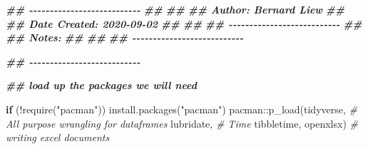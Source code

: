 \documentclass[
]{book}
\newenvironment{Shaded}{\begin{snugshade}}{\end{snugshade}}
\newcommand{\CommentTok}[1]{\textcolor[rgb]{0.56,0.35,0.01}{\textit{#1}}}
\newcommand{\ControlFlowTok}[1]{\textcolor[rgb]{0.13,0.29,0.53}{\textbf{#1}}}
\newcommand{\DocumentationTok}[1]{\textcolor[rgb]{0.56,0.35,0.01}{\textbf{\textit{#1}}}}
\newcommand{\FunctionTok}[1]{\textcolor[rgb]{0.00,0.00,0.00}{#1}}
\newcommand{\NormalTok}[1]{#1}
\newcommand{\SpecialCharTok}[1]{\textcolor[rgb]{0.00,0.00,0.00}{#1}}
\newcommand{\StringTok}[1]{\textcolor[rgb]{0.31,0.60,0.02}{#1}}
\begin{document}
\begin{Shaded}
\begin{Highlighting}[]

\DocumentationTok{\#\# {-}{-}{-}{-}{-}{-}{-}{-}{-}{-}{-}{-}{-}{-}{-}{-}{-}{-}{-}{-}{-}{-}{-}{-}{-}{-}{-}}
\DocumentationTok{\#\#}
\DocumentationTok{\#\#}
\DocumentationTok{\#\# Author: Bernard Liew}
\DocumentationTok{\#\#}
\DocumentationTok{\#\# Date Created: 2020{-}09{-}02}
\DocumentationTok{\#\#}
\DocumentationTok{\#\#}
\DocumentationTok{\#\# {-}{-}{-}{-}{-}{-}{-}{-}{-}{-}{-}{-}{-}{-}{-}{-}{-}{-}{-}{-}{-}{-}{-}{-}{-}{-}{-}}
\DocumentationTok{\#\#}
\DocumentationTok{\#\# Notes:}
\DocumentationTok{\#\#   }
\DocumentationTok{\#\#}
\DocumentationTok{\#\# {-}{-}{-}{-}{-}{-}{-}{-}{-}{-}{-}{-}{-}{-}{-}{-}{-}{-}{-}{-}{-}{-}{-}{-}{-}{-}{-}}

\DocumentationTok{\#\# {-}{-}{-}{-}{-}{-}{-}{-}{-}{-}{-}{-}{-}{-}{-}{-}{-}{-}{-}{-}{-}{-}{-}{-}{-}{-}{-}}

\DocumentationTok{\#\# load up the packages we will need}

\ControlFlowTok{if}\NormalTok{ (}\SpecialCharTok{!}\FunctionTok{require}\NormalTok{(}\StringTok{"pacman"}\NormalTok{)) }\FunctionTok{install.packages}\NormalTok{(}\StringTok{"pacman"}\NormalTok{)}
\NormalTok{pacman}\SpecialCharTok{::}\FunctionTok{p\_load}\NormalTok{(tidyverse, }\CommentTok{\# All purpose wrangling for dataframes}
\NormalTok{               lubridate, }\CommentTok{\# Time}
\NormalTok{               tibbletime,}
\NormalTok{               openxlsx) }\CommentTok{\# writing excel documents}


\end{Highlighting}
\end{Shaded}
\end{document}
